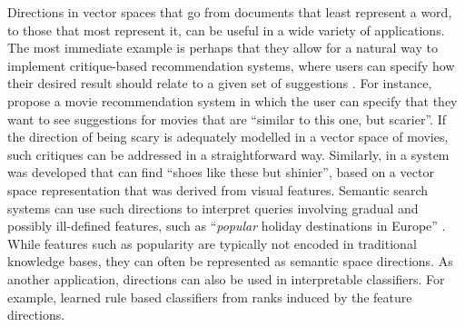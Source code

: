 

Directions in vector spaces that go from documents that least represent a word, to those that most represent it, can be useful in a wide variety of applications. The most immediate example is perhaps that they allow for a natural way to implement critique-based recommendation systems, where users can specify how their desired result should relate to a given set of suggestions \cite{Viappiani2006}. For instance, \cite{Vig2014} propose a movie recommendation system in which the user can specify that they want to see suggestions for movies that are ``similar to this one, but scarier''. If the direction of being scary is adequately modelled in a vector space of movies, such critiques can be addressed in a straightforward way. Similarly, in \cite{Kovashka} a system was developed that can find ``shoes like these but shinier'', based on a vector space representation that was derived from visual features. Semantic search systems can use such directions to interpret queries involving gradual and possibly ill-defined features, such as ``\emph{popular} holiday destinations in Europe'' \cite{Jameel}. While features such as popularity are typically not encoded in traditional knowledge bases, they can often be represented as semantic space directions.  As another application, directions can also be used in interpretable classifiers. For example, \cite{Derrac2015} learned rule based classifiers from ranks induced by the feature directions.

